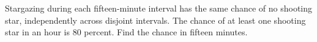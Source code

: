 Stargazing during each fifteen-minute interval has the same chance of no shooting star, independently across disjoint intervals. The chance of at least one shooting star in an hour is 80 percent. Find the chance in fifteen minutes.
